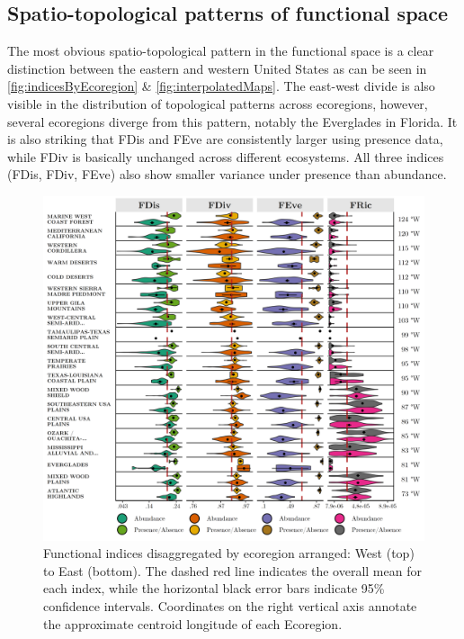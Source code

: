 \documentclass[
  10pt,
]{article}
\begin{document}
\hypertarget{mapSection}{%
\subsection{Spatio-topological patterns of functional space}\label{mapSection}}

The most obvious spatio-topological pattern in the functional space is a clear distinction between the eastern and western United States as can be seen in \autoref{fig:indicesByEcoregion} \& \autoref{fig:interpolatedMaps}. The east-west divide is also visible in the distribution of topological patterns across ecoregions, however, several ecoregions diverge from this pattern, notably the Everglades in Florida. It is also striking that FDis and FEve are consistently larger using presence data, while FDiv is basically unchanged across different ecosystems. All three indices (FDis, FDiv, FEve) also show smaller variance under presence than abundance.

\begin{figure}
  \centering
  \includegraphics[width=\textwidth]{../Final Visualizations/index_by_ecoregion.png}
  \caption{Functional indices disaggregated by ecoregion arranged: West (top) to East (bottom). The dashed red line indicates the overall mean for each index, while the horizontal black error bars indicate 95\% confidence intervals. Coordinates on the right vertical axis annotate the approximate centroid longitude of each Ecoregion.}
  \label{fig:indicesByEcoregion}
  \vspace{-3cm}     
\end{figure}
\end{document}
